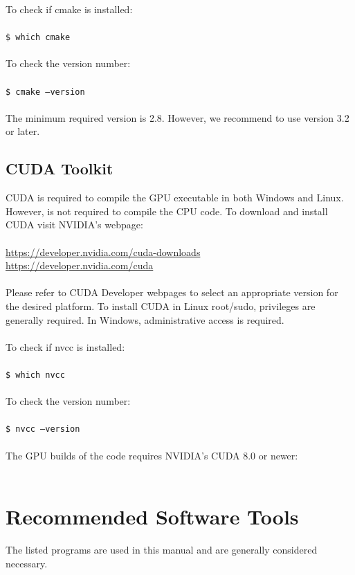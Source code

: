 To check if cmake is installed:\\\\
\texttt{\$ which cmake}\\\\
To check the version number:\\\\
\texttt{\$ cmake --version}\\\\
The minimum required version is 2.8. However, we recommend to use version 3.2 or later. \\

\subsection{CUDA Toolkit}
CUDA is required to compile the GPU executable in both Windows and Linux. However, is not required to compile the CPU code.  To download and install CUDA visit NVIDIA's webpage:\\\\
\url{https://developer.nvidia.com/cuda-downloads}\\
\url{https://developer.nvidia.com/cuda}\\\\

Please refer to CUDA Developer webpages to select an appropriate version for the desired platform. 
To install CUDA in Linux root/sudo, privileges are generally required.  In Windows, administrative access is required.\\\\
To check if nvcc is installed:\\\\
\texttt{\$ which nvcc}\\\\
To check the version number:\\\\
\texttt{\$ nvcc --version}\\\\
The GPU builds of the code requires NVIDIA's CUDA 8.0 or newer:\\\\


\section{Recommended Software Tools}
The listed programs are used in this manual and are generally considered necessary.

